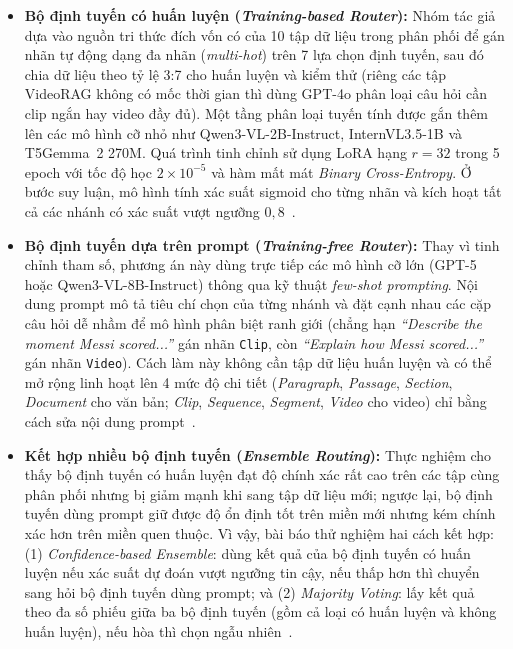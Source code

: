 \begin{itemize}
    \item \textbf{Bộ định tuyến có huấn luyện (\textit{Training-based Router}):} Nhóm tác giả dựa vào nguồn tri thức đích vốn có của 10 tập dữ liệu trong phân phối để gán nhãn tự động dạng đa nhãn (\textit{multi-hot}) trên 7 lựa chọn định tuyến, sau đó chia dữ liệu theo tỷ lệ 3:7 cho huấn luyện và kiểm thử (riêng các tập VideoRAG không có mốc thời gian thì dùng GPT-4o phân loại câu hỏi cần clip ngắn hay video đầy đủ). Một tầng phân loại tuyến tính được gắn thêm lên các mô hình cỡ nhỏ như Qwen3-VL-2B-Instruct, InternVL3.5-1B và T5Gemma~2 270M. Quá trình tinh chỉnh sử dụng LoRA hạng $r = 32$ trong 5 epoch với tốc độ học $2 \times 10^{-5}$ và hàm mất mát \textit{Binary Cross-Entropy}. Ở bước suy luận, mô hình tính xác suất sigmoid cho từng nhãn và kích hoạt tất cả các nhánh có xác suất vượt ngưỡng $0{,}8$~\cite{yeo2026universalrag}.

    \item \textbf{Bộ định tuyến dựa trên prompt (\textit{Training-free Router}):} Thay vì tinh chỉnh tham số, phương án này dùng trực tiếp các mô hình cỡ lớn (GPT-5 hoặc Qwen3-VL-8B-Instruct) thông qua kỹ thuật \textit{few-shot prompting}. Nội dung prompt mô tả tiêu chí chọn của từng nhánh và đặt cạnh nhau các cặp câu hỏi dễ nhầm để mô hình phân biệt ranh giới (chẳng hạn \textit{``Describe the moment Messi scored...''} gán nhãn \texttt{Clip}, còn \textit{``Explain how Messi scored...''} gán nhãn \texttt{Video}). Cách làm này không cần tập dữ liệu huấn luyện và có thể mở rộng linh hoạt lên 4 mức độ chi tiết (\textit{Paragraph}, \textit{Passage}, \textit{Section}, \textit{Document} cho văn bản; \textit{Clip}, \textit{Sequence}, \textit{Segment}, \textit{Video} cho video) chỉ bằng cách sửa nội dung prompt~\cite{yeo2026universalrag}.

    \item \textbf{Kết hợp nhiều bộ định tuyến (\textit{Ensemble Routing}):} Thực nghiệm cho thấy bộ định tuyến có huấn luyện đạt độ chính xác rất cao trên các tập cùng phân phối nhưng bị giảm mạnh khi sang tập dữ liệu mới; ngược lại, bộ định tuyến dùng prompt giữ được độ ổn định tốt trên miền mới nhưng kém chính xác hơn trên miền quen thuộc. Vì vậy, bài báo thử nghiệm hai cách kết hợp: (1) \textit{Confidence-based Ensemble}: dùng kết quả của bộ định tuyến có huấn luyện nếu xác suất dự đoán vượt ngưỡng tin cậy, nếu thấp hơn thì chuyển sang hỏi bộ định tuyến dùng prompt; và (2) \textit{Majority Voting}: lấy kết quả theo đa số phiếu giữa ba bộ định tuyến (gồm cả loại có huấn luyện và không huấn luyện), nếu hòa thì chọn ngẫu nhiên~\cite{yeo2026universalrag}.
\end{itemize}

